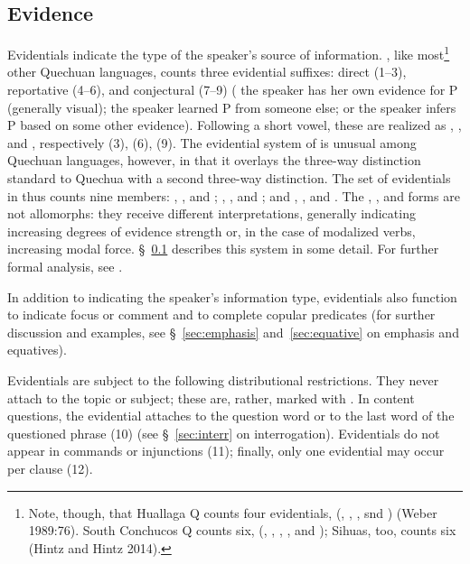 \subsection{Evidence}\label{ssec:evidence}
Evidentials indicate the type of the speaker's source of information. \SYQ{}, like most\footnote{Note, though, that Huallaga Q counts four evidentials, (, , , snd ) (Weber 1989:76). South Conchucos Q counts six, (, , , , and ); Sihuas, too, counts six (Hintz and Hintz 2014).} other Quechuan languages, counts three evidential suffixes: direct  (1--3), reportative  (4--6), and conjectural  (7--9) (\ie{} the speaker has her own evidence for P (generally visual); the speaker learned P from someone else; or the speaker infers P based on some other evidence). Following a short vowel, these are realized as , , and , respectively (3), (6), (9). The evidential system of \SYQ{} is unusual among Quechuan languages, however, in that it overlays the three-way distinction standard to Quechua with a second three-way distinction. The set of evidentials in \SYQ{} thus counts nine members: , , and ; , , and ; and , , and . The , , and  forms are not allomorphs: they receive different interpretations, generally indicating increasing degrees of evidence strength or, in the case of modalized verbs, increasing modal force. \S~\ref{ssec:evidence} describes this system in some detail. For further formal analysis, see \citet{Shimelman12}.

In addition to indicating the speaker's information type, evidentials also function to indicate focus or comment and to complete copular predicates (for surther discussion and examples, see \S~\ref{sec:emphasis} and~\ref{sec:equative} on emphasis and equatives).

Evidentials are subject to the following distributional restrictions. They never attach to the topic or subject; these are, rather, marked with . In content questions, the evidential attaches to the question word or to the last word of the questioned phrase (10) (see \S~\ref{sec:interr} on interrogation). Evidentials do not appear in commands or injunctions (11); finally, only one evidential may occur per clause (12).

